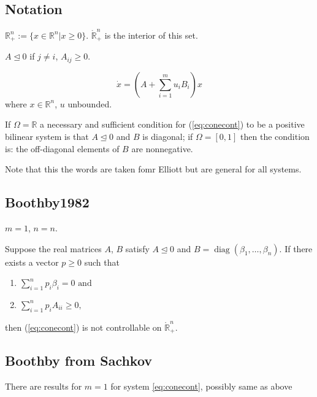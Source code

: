 \subsection{Notation}
\begin{definition}
 $\mathbb{R}_+^n := \{x \in \mathbb{R}^n | x \geq 0\}$. $\mathring{\mathbb{R}}_+^n$ is the interior of this set.
\end{definition}

\begin{definition}
 $A \trianglelefteq 0$ if $j \neq i$, $A_{ij} \geq 0$.
\end{definition}

\begin{equation}
 \dot{x} = \left(A+\sum_{i=1}^mu_iB_i\right)x \label{eq:conecont}
\end{equation}
where $x \in \mathbb{R}^n$, $u$ unbounded.

\begin{proposition}
 If $\Omega = \mathbb{R}$ a necessary and sufficient condition for (\ref{eq:conecont}) to be a
positive bilinear system is that $A \trianglelefteq 0$ and $B$ is diagonal; if $\Omega = [0, 1]$ then the condition is: the off-diagonal elements of $B$ are nonnegative. \label{thm:nsposbil}
\end{proposition}
Note that this the words are taken fomr Elliott but are general for all systems.

\subsection{Boothby1982}
$m=1$, $n=n$.

\begin{theorem}[Boothby] Suppose the real matrices $A$, $B$ satisfy $A \trianglelefteq 0$ and $B = \operatorname{diag}(\beta_1 , \ldots , \beta_n )$. If there exists a vector $p \geq 0$ such that
 \begin{enumerate}
  \item $\sum_{i=1}^np_i\beta_i = 0 \text{ and}$
\item $\sum_{i=1}^np_iA_{ii} \geq 0,$
 \end{enumerate}
then (\ref{eq:conecont}) is not controllable on $\mathring{\mathbb{R}}_+^n$.
\end{theorem}

\subsection{Boothby from Sachkov}
There are results for $m=1$ for system \ref{eq:conecont}, possibly same as above

